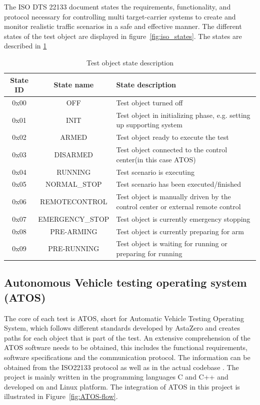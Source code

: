 The ISO DTS 22133 document states the requirements, functionality, and protocol necessary for controlling multi target-carrier systems to create and monitor realistic traffic scenarios in a safe and effective manner.
The different states of the test object are displayed in figure~\ref{fig:iso_states}. The states are described in \ref{tab:states}

\begin{table}[!h]
  \centering
  \begin{tabular}{|c|c|p{}|}
    \hline
    \textbf{State ID} & \textbf{State name} & \textbf{State description} \\
    \hline
    0x00 & OFF& Test object turned off \\
    \hline
    0x01 & INIT& Test object in initializing phase, e.g. setting up supporting system\\
    \hline
   0x02 & ARMED &Test object ready to execute the test \\
    \hline
    0x03 & DISARMED & Test object connected to the control center(in this case ATOS) \\
    \hline
    0x04& RUNNING & Test scenario is executing  \\
    \hline
    0x05 & NORMAL\_STOP &Test scenario has been executed/finished \\
    \hline
      0x06 & REMOTECONTROL & Test object is manually driven by the control center or external remote control\\
    \hline
     0x07 &EMERGENCY\_STOP & Test object is currently emergency stopping\\
    \hline
      0x08 &PRE-ARMING& Test object is currently preparing for arm\\
    \hline
      0x09 & PRE-RUNNING &Test object is waiting for running or preparing for running \\
    \hline
  
  \end{tabular}
  \caption{Test object state description}
  \label{tab:states}
\end{table} 
\subsection{Autonomous Vehicle testing operating system (ATOS)} \label{ATOS}
The core of each test is ATOS, short for Automatic Vehicle Testing Operating System, which follows different standards developed by AstaZero and creates paths for each object that is part of the test. An extensive comprehension of the ATOS software needs to be obtained, this includes the functional requirements, software specifications and the communication protocol. The information can be obtained from the ISO22133 protocol  as well as in the actual codebase . The project is mainly written in the programming languages C and C++ and developed on and Linux platform. The integration of ATOS in this project is illustrated in Figure~\ref{fig:ATOS-flow}.

